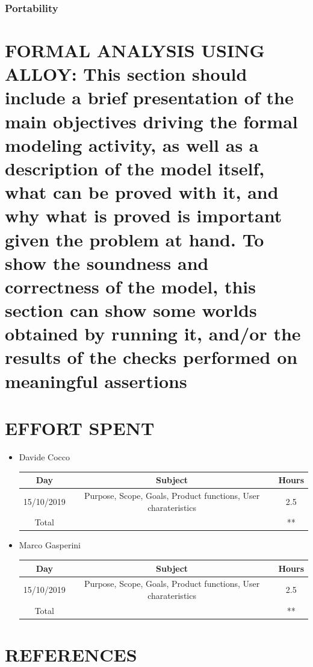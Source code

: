 \documentclass[12pt,a4paper]{article}
\begin{document}
\subsubsection{Portability}
\section{FORMAL	ANALYSIS	USING	ALLOY: This	section	should include	a	brief	presentation	of the	
main	objectives	driving	the	formal	modeling	activity, as	well	as	a	description	of the	model	
itself,	what	can	be	proved with	it, and	why	what	is	proved is	important	given	the	problem	at	
hand. To	show	 the	soundness	and	correctness	of	the model,	 this	section	can	show	some
worlds	obtained	by	running	it,	and/or	the	results	of	the	checks	performed	on	meaningful	
assertions}
\section{EFFORT	SPENT}
\begin{itemize}
\item {Davide Cocco}
 \begin{center}
			\begin{tabular}{| c | c | c |}
				\hline
				Day & Subject & Hours \\ \hline
				15/10/2019 & Purpose, Scope, Goals, Product functions, User charateristics & 2.5 \\
				\hline
				Total & & ** \\
				\hline
			\end{tabular}
		\end{center}
\item {Marco Gasperini}
\begin{center}
			\begin{tabular}{| c | c | c |}
				\hline
				Day & Subject & Hours \\ \hline
				15/10/2019 & Purpose, Scope, Goals, Product functions, User charateristics & 2.5 \\
				\hline
				Total & & ** \\
				\hline
			\end{tabular}
\end{center}
\end{itemize}
\section{REFERENCES}
\end{document}
